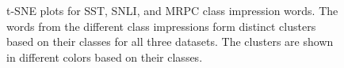 \begin{figure}[!h]
    \centering
    \hfill
    \hfill
    \caption{
        t-SNE plots for SST, SNLI, and MRPC class impression words. The words from the different class impressions form distinct clusters based on their classes for all three datasets. The clusters are shown in different colors based on their classes.
    }
    \label{fig:t-SNE plots}
\end{figure}




\begin{figure}
 \centering
 \begin{tabular}{c}
\end{tabular}
\end{figure}
